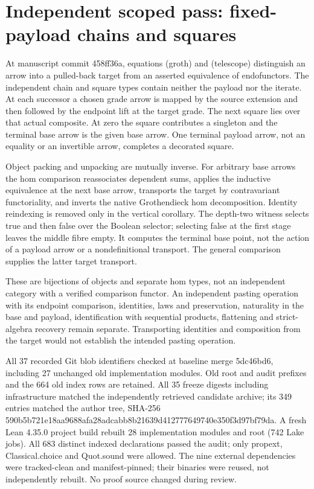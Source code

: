 \documentclass{article}
\begin{document}
\section*{Independent scoped pass: fixed-payload chains and squares}
At manuscript commit 458ff36a, equations (groth) and (telescope) distinguish an arrow into a pulled-back target from an asserted equivalence of endofunctors. The independent chain and square types contain neither the payload nor the iterate. At each successor a chosen grade arrow is mapped by the source extension and then followed by the endpoint lift at the target grade. The next square lies over that actual composite. At zero the square contributes a singleton and the terminal base arrow is the given base arrow. One terminal payload arrow, not an equality or an invertible arrow, completes a decorated square.
\par Object packing and unpacking are mutually inverse. For arbitrary base arrows the hom comparison reassociates dependent sums, applies the inductive equivalence at the next base arrow, transports the target by contravariant functoriality, and inverts the native Grothendieck hom decomposition. Identity reindexing is removed only in the vertical corollary. The depth-two witness selects true and then false over the Boolean selector; selecting false at the first stage leaves the middle fibre empty. It computes the terminal base point, not the action of a payload arrow or a nondefinitional transport. The general comparison supplies the latter target transport.
\par These are bijections of objects and separate hom types, not an independent category with a verified comparison functor. An independent pasting operation with its endpoint comparison, identities, laws and preservation, naturality in the base and payload, identification with sequential products, flattening and strict-algebra recovery remain separate. Transporting identities and composition from the target would not establish the intended pasting operation.
\par All 37 recorded Git blob identifiers checked at baseline merge 5dc46bd6, including 27 unchanged old implementation modules. Old root and audit prefixes and the 664 old index rows are retained. All 35 freeze digests including infrastructure matched the independently retrieved candidate archive; its 349 entries matched the author tree, SHA-256 590b5b721e18aa9688afa28adcabb8b21639d412777649740e350f3d97bf79da. A fresh Lean 4.35.0 project build rebuilt 28 implementation modules and root (742 Lake jobs). All 683 distinct indexed declarations passed the audit; only propext, Classical.choice and Quot.sound were allowed. The nine external dependencies were tracked-clean and manifest-pinned; their binaries were reused, not independently rebuilt. No proof source changed during review.
\end{document}
